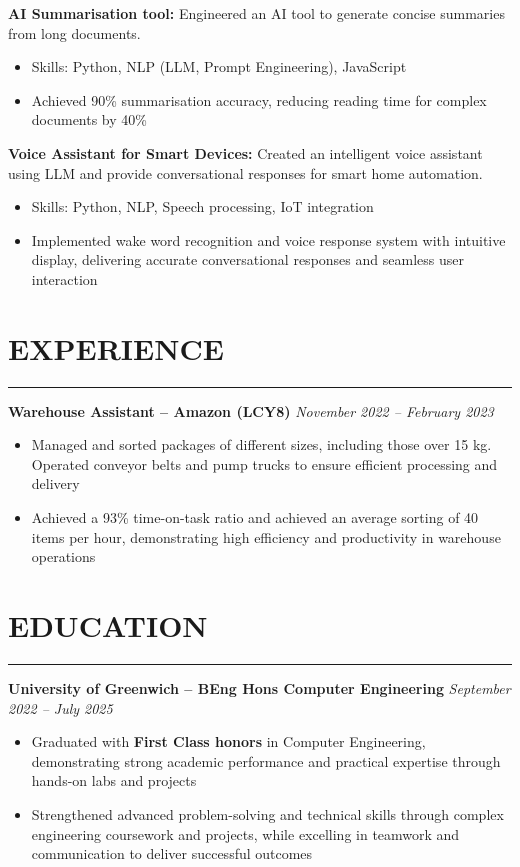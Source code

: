 \documentclass[11pt, letterpaper]{article} %
\newcommand{\resumesection}[1]{%
    \section*{#1}
    \vspace{-8pt}
    \noindent\rule{\textwidth}{0.6pt}
    \vspace{1pt}
    \noindent
}
\begin{document}
\vspace{6pt}

\noindent\textbf{AI Summarisation tool:} Engineered an AI tool to generate concise summaries from long documents.
\begin{itemize}
    \item Skills: Python, NLP (LLM, Prompt Engineering), JavaScript
    \item Achieved 90\% summarisation accuracy, reducing reading time for complex documents by 40\%
\end{itemize}

\vspace{6pt}

\noindent\textbf{Voice Assistant for Smart Devices:} Created an intelligent voice assistant using LLM and provide conversational responses for smart home automation.
\begin{itemize}
    \item Skills: Python, NLP, Speech processing, IoT integration
    \item Implemented wake word recognition and voice response system with intuitive display, delivering accurate conversational responses and seamless user interaction
\end{itemize}

\vspace{6pt}

\resumesection{EXPERIENCE}\noindent\textbf{Warehouse Assistant – Amazon (LCY8)} \hfill \textit{November 2022 – February 2023}
\begin{itemize}
    \item Managed and sorted packages of different sizes, including those over 15 kg. Operated conveyor belts and pump trucks to ensure efficient processing and delivery
    \item Achieved a 93\% time-on-task ratio and achieved an average sorting of 40 items per hour, demonstrating high efficiency and productivity in warehouse operations
\end{itemize}

\vspace{6pt}

\resumesection{EDUCATION}\textbf{University of Greenwich – BEng Hons Computer Engineering} \hfill \textit{September 2022 – July 2025}
\begin{itemize}
    \item Graduated with \textbf{First Class honors} in Computer Engineering, demonstrating strong academic performance and practical expertise through hands-on labs and projects
    \item Strengthened advanced problem-solving and technical skills through complex engineering coursework and projects, while excelling in teamwork and communication to deliver successful outcomes
\end{itemize}
\end{document}

